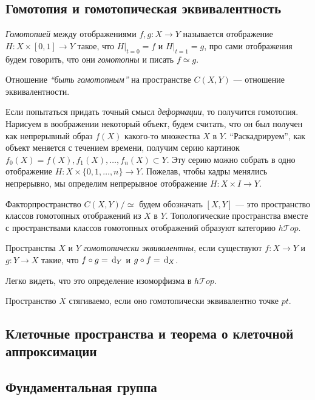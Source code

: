 \subsection{Гомотопия и гомотопическая эквивалентность}
\begin{defin}
	\textit{Гомотопией} между отображениями $f,g\colon X\to Y$ называется отображение $H\colon X\times[0,1]\to Y$ такое, что $H|_{t=0}=f$ и $H|_{t=1}=g$, про сами отображения будем говорить, что они \textit{гомотопны} и писать $f\simeq g$.
\end{defin}
\begin{prop}
	Отношение \textit{``быть гомотопным''} на пространстве $C(X,Y)$ --- отношение эквивалентности.
\end{prop}
Если попытаться придать точный смысл \textit{деформации}, то получится гомотопия. Нарисуем в воображении некоторый объект, будем считать, что он был получен как непрерывный образ $f(X)$ какого-то множества $X$ в $Y$. ``Раскадрируем'', как объект меняется с течением времени, получим серию картинок $f_0(X)=f(X), f_1(X),\ldots, f_n(X)\subset Y$. Эту серию можно собрать в одно отображение $H\colon X\times\{0,1,\ldots,n\}\to Y$. Пожелав, чтобы кадры менялись непрерывно, мы определим непрерывное отображение $H\colon X\times I\to Y$.

Факторпространство $C(X,Y)/\simeq$ будем обозначать $[X,Y]$ --- это пространство классов гомотопных отображений из $X$ в $Y$. Топологические пространства вместе с пространствами классов гомотопных отображений образуют категорию $h\mathcal{T}op$.

\begin{defin}
	Пространства $X$ и $Y$ \textit{гомотопически эквивалентны}, если существуют $f\colon X\to Y$ и $g\colon Y\to X$ такие, что $f\circ g=\,\mathrm{d}_Y$ и $g\circ f=\,\mathrm{d}_X$.
\end{defin}
Легко видеть, что это определение изоморфизма в $h\mathcal{T}op$.

\begin{defin}
	Пространство $X$ стягиваемо, если оно гомотопически эквивалентно точке $pt$.
\end{defin}

\subsection{Клеточные пространства и теорема о клеточной аппроксимации}

\subsection{Фундаментальная группа}

